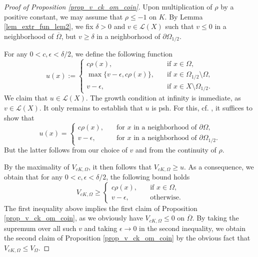 \documentclass[12pt]{article}
\numberwithin{equation}{section}
\theoremstyle{theorem}
\theoremstyle{definition}
\theoremstyle{remark}
\begin{document}
	\begin{proof}[Proof of Proposition \ref{prop_v_ck_om_coin}]
		Upon multiplication of $\rho$ by a positive constant, we may assume that $\rho \leq -1$ on $K$.
		By Lemma \ref{lem_extr_fun_lem2}, we fix $\delta > 0$ and $v \in \mathscr{L}(X)$ such that $v \leq 0$ in a neighborhood of $\overline{\Omega}$, but $v \geq \delta$ in a neighborhood of $\partial \Omega_{1/2}$.
		\par 
		For any $0 < c, \epsilon < \delta/2$, we define the following function
		\begin{equation}\label{eq_part_def_u_psh}
			u(x) 
			:=
			\begin{cases}
				c \rho(x), \quad &\text{if } x \in \Omega,
				\\
				\max \big\{ v - \epsilon,  c \rho(x) \big\}, \quad &\text{if } x \in \Omega_{1/2} \setminus \Omega,
				\\
				v - \epsilon, \quad &\text{if } x \in X \setminus \Omega_{1/2}.
			\end{cases} 
		\end{equation}
		We claim that $u \in \mathscr{L}(X)$.
		The growth condition at infinity is immediate, as $v \in \mathscr{L}(X)$.
		It only remains to establish that $u$ is psh.
		For this, cf. \cite[Corollary 2.9.15]{KlimekBook}, it suffices to show that 
		\begin{equation}
			u(x) 
			=
			\begin{cases}
				c \rho(x), \quad &\text{for $x$ in a neighborhood of $\partial \Omega$},
				\\
				v - \epsilon, \quad &\text{for $x$ in a neighborhood of $\partial \Omega_{1/2}$.}
			\end{cases} 
		\end{equation}
		But the latter follows from our choice of $v$ and from the continuity of $\rho$.
		\par 
		By the maximality of $V_{c K, \Omega}$, it then follows that $V_{c K, \Omega} \geq u$.
		As a consequence, we obtain that for any $0 < c, \epsilon < \delta/2$, the following bound holds
		\begin{equation}\label{eq_vck_low_bnd}
			V_{c K, \Omega}
			\geq
			\begin{cases}
				c \rho(x), \quad &\text{if } x \in \Omega,
				\\
				v - \epsilon, \quad &\text{otherwise.}
			\end{cases} 
		\end{equation}
		The first inequality above implies the first claim of Proposition \ref{prop_v_ck_om_coin}, as we obviously have $V_{c K, \Omega} \leq 0$ on $\overline{\Omega}$.
		By taking the supremum over all such $v$ and taking $\epsilon \to 0$ in the second inequality, we obtain the second claim of Proposition \ref{prop_v_ck_om_coin} by the obvious fact that $V_{c K, \Omega} \leq V_{\Omega}$.
	\end{proof}
\end{document}
